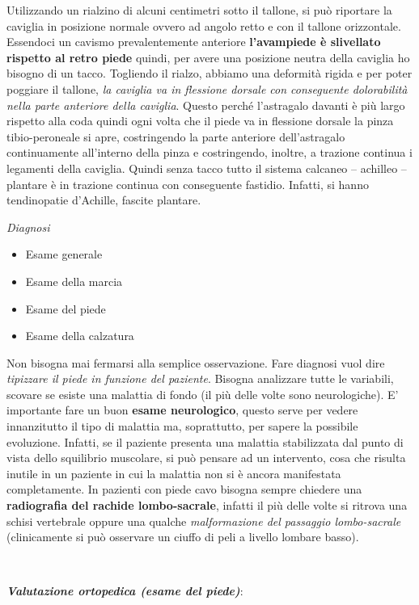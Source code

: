 \documentclass[]{article}
\begin{document}
Utilizzando un rialzino di alcuni centimetri sotto il tallone, si può
riportare la caviglia in posizione normale ovvero ad angolo retto e con
il tallone orizzontale. Essendoci un cavismo prevalentemente anteriore
\textbf{l'avampiede è slivellato rispetto al retro piede} quindi, per
avere una posizione neutra della caviglia ho bisogno di un tacco.
Togliendo il rialzo, abbiamo una deformità rigida e per poter poggiare
il tallone, \emph{la caviglia va in flessione dorsale con conseguente
dolorabilità nella parte anteriore della caviglia}. Questo perché
l'astragalo davanti è più largo rispetto alla coda quindi ogni volta che
il piede va in flessione dorsale la pinza tibio-peroneale si apre,
costringendo la parte anteriore dell'astragalo continuamente all'interno
della pinza e costringendo, inoltre, a trazione continua i legamenti
della caviglia. Quindi senza tacco tutto il sistema calcaneo -- achilleo
-- plantare è in trazione continua con conseguente fastidio. Infatti, si
hanno tendinopatie d'Achille, fascite plantare.

\emph{Diagnosi}

\begin{itemize}
\item
  Esame generale
\item
  Esame della marcia
\item
  Esame del piede
\item
  Esame della calzatura
\end{itemize}

Non bisogna mai fermarsi alla semplice osservazione. Fare diagnosi vuol
dire \emph{\emph{tipizzare il piede in funzione del paziente}}. Bisogna
analizzare tutte le variabili, scovare se esiste una malattia di fondo
(il più delle volte sono neurologiche). E' importante fare un buon
\textbf{esame neurologico}, questo serve per vedere innanzitutto il tipo
di malattia ma, soprattutto, per sapere la possibile evoluzione.
Infatti, se il paziente presenta una malattia stabilizzata dal punto di
vista dello squilibrio muscolare, si può pensare ad un intervento, cosa
che risulta inutile in un paziente in cui la malattia non si è ancora
manifestata completamente. In pazienti con piede cavo bisogna sempre
chiedere una \textbf{radiografia del rachide lombo-sacrale}, infatti il
più delle volte si ritrova una schisi vertebrale oppure una qualche
\emph{malformazione del passaggio lombo-sacrale} (clinicamente si può
osservare un ciuffo di peli a livello lombare basso).

~

\emph{\textbf{Valutazione ortopedica (esame del piede)}}:
\end{document}
